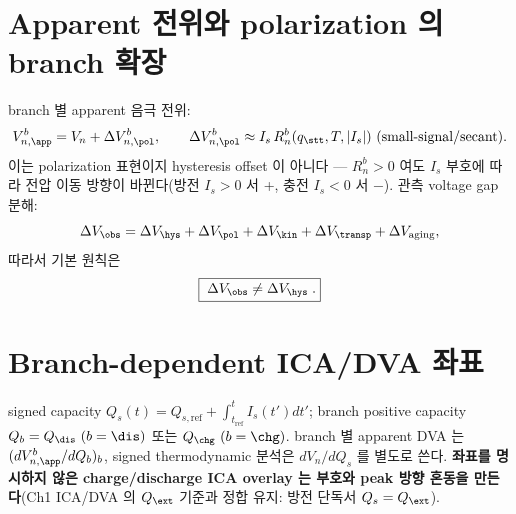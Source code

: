 \section{Apparent 전위와 polarization 의 branch 확장}\label{sec:ch5_apparent}
branch 별 apparent 음극 전위:
\begin{equation}
V_{n,\app}^b=V_n+\Delta V_{n,\pol}^b,\qquad \Delta V_{n,\pol}^b\approx I_s\,R_n^b(q_\stt,T,|I_s|)\ \text{(small-signal/secant)}.
\label{eq:ch5_vapp_branch}
\end{equation}
이는 polarization 표현이지 hysteresis offset 이 아니다 — $R_n^b>0$ 여도 $I_s$ 부호에 따라 전압 이동 방향이
바뀐다(방전 $I_s>0$ 서 +, 충전 $I_s<0$ 서 $-$). 관측 voltage gap 분해:
\begin{equation}
\Delta V_\obs=\Delta V_\hys+\Delta V_\pol+\Delta V_\kin+\Delta V_\transp+\Delta V_{\mathrm{aging}},
\label{eq:ch5_gap_decomp}
\end{equation}
따라서 기본 원칙은
\begin{equation}
\boxed{\;\Delta V_\obs\ne\Delta V_\hys\;.}
\label{eq:ch5_obs_not_hys}
\end{equation}

\section{Branch-dependent ICA/DVA 좌표}\label{sec:ch5_icadva}
signed capacity $Q_s(t)=Q_{s,\mathrm{ref}}+\int_{t_{\mathrm{ref}}}^t I_s(t')dt'$; branch positive capacity
$Q_b=Q_\dis\ (b=\dis)$ 또는 $Q_\chg\ (b=\chg)$. branch 별 apparent DVA 는 $(dV_{n,\app}^b/dQ_b)_b$, signed
thermodynamic 분석은 $dV_n/dQ_s$ 를 별도로 쓴다. \textbf{좌표를 명시하지 않은 charge/discharge ICA overlay 는
부호와 peak 방향 혼동을 만든다}(Ch1 ICA/DVA 의 $Q_\ext$ 기준과 정합 유지: 방전 단독서 $Q_s=Q_\ext$).

